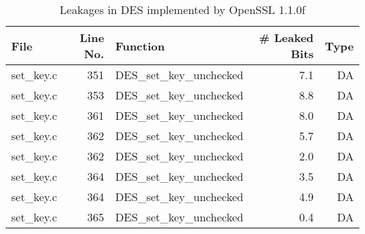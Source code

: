 \begin{table}[h!]
\centering\tiny\scriptsize
\caption{Leakages in DES implemented by OpenSSL 1.1.0f}\label{tab:DESOpenSSL1.1.0f}
\begin{tabular}{lrlrr}
\hline
\textbf{File} & \textbf{Line No.} & \textbf{Function} & \textbf{\# Leaked Bits} & \textbf{Type} \\\hline
set\_key.c& 351&DES\_set\_key\_unchecked&7.1 &DA\\
set\_key.c& 353&DES\_set\_key\_unchecked&8.8 &DA\\
set\_key.c& 361&DES\_set\_key\_unchecked&8.0 &DA\\
set\_key.c& 362&DES\_set\_key\_unchecked&5.7 &DA\\
set\_key.c& 362&DES\_set\_key\_unchecked&2.0 &DA\\
set\_key.c& 364&DES\_set\_key\_unchecked&3.5 &DA\\
set\_key.c& 364&DES\_set\_key\_unchecked&4.9 &DA\\
set\_key.c& 365&DES\_set\_key\_unchecked&0.4 &DA\\
\hline
\end{tabular}
\renewcommand{\baselinestretch}{1.0}\selectfont
\end{table}

